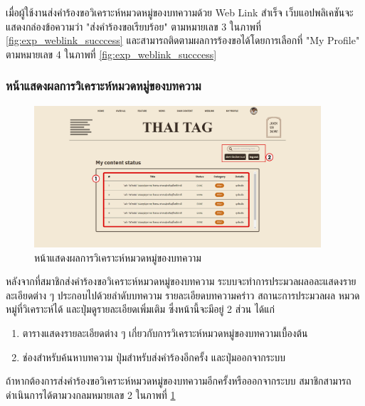 \documentclass[12pt,oneside,openright,a4paper]{cpe-thai-project}
\begin{document}
          \hspace{1cm}เมื่อผู้ใช้งานส่งคำร้องขอวิเคราะห์หมวดหมู่ของบทความด้วย Web Link สำเร็จ 
          เว็บแอปพลิเคชันจะแสดงกล่องข้อความว่า "ส่งคำร้องขอเรียบร้อย" ตามหมายเลข 3 ในภาพที่ \ref{fig:exp_weblink_succcess}
          และสามารถติดตามผลการร้องขอได้โดยการเลือกที่ "My Profile" ตามหมายเลข 4 ในภาพที่ \ref{fig:exp_weblink_succcess} 

        \subsubsection{หน้าแสดงผลการวิเคราะห์หมวดหมู่ของบทความ}
          \begin{figure}[!ht]\centering
            \includegraphics[width=0.95\textwidth]{./img/project_ui/4_7.png}
            \caption{หน้าแสดงผลการวิเคราะห์หมวดหมู่ของบทความ}\label{fig:exp_result}
          \end{figure}
          \hspace{1cm}หลังจากที่สมาชิกส่งคำร้องขอวิเคราะห์หมวดหมู่ของบทความ ระบบจะทำการประมวลผลอละแสดงรายละเอียดต่าง ๆ 
          ประกอบไปด้วยลำดับบทความ รายละเอียดบทความคร่าว สถานะการประมวลผล หมวดหมู่ที่วิเคราะห์ได้ และปุ่มดูรายละเอียดเพิ่มเติม 
          ซึ่งหน้านี้จะมีอยู่ 2 ส่วน ได้แก่
          \begin{enumerate}
            \item ตารางแสดงรายละเอียดต่าง ๆ เกี่ยวกับการวิเคราะห์หมวดหมู่ของบทความเบื้องต้น
            \item ช่องสำหรับค้นหาบทความ ปุ่มสำหรับส่งคำร้องอีกครั้ง และปุ่มออกจากระบบ
          \end{enumerate}
          \hspace{1cm}ถ้าหากต้องการส่งคำร้องขอวิเคราะห์หมวดหมู่ของบทความอีกครั้งหรือออกจากระบบ สมาชิกสามารถดำเนินการได้ตามวงกลมหมายเลข 2 
          ในภาพที่ \ref{fig:exp_result} 
\end{document}
